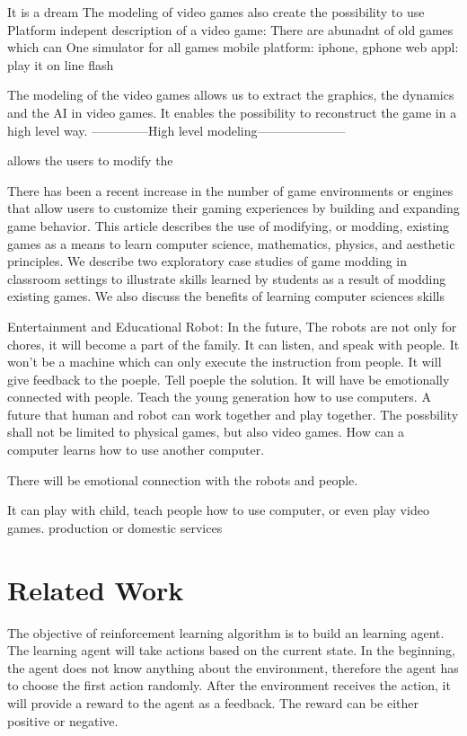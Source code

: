 It is a dream
The modeling of video games also create the possibility to use 
Platform indepent description of a video game:
There are abunadnt of old games which can 
One simulator for all games
mobile platform: iphone, gphone
web appl: play it on line flash

The modeling of the video games allows us to extract the graphics, the dynamics
and the AI in video games. It enables the possibility to reconstruct the game in 
a high level way. 
--------------High level modeling---------------------


allows the users to modify the 

There has been a recent increase in the number of game environments or engines
that allow users to customize their gaming experiences by building and
expanding game behavior. This article describes the use of modifying, or
modding, existing games as a means to learn computer science, mathematics,
physics, and aesthetic principles. We describe two exploratory case studies of
game modding in classroom settings to illustrate skills learned by students as
a result of modding existing games. We also discuss the benefits of learning
computer sciences skills


Entertainment and Educational Robot:
In the future, 
The robots are not only for chores, it will become a part of the family.
It can listen, and speak with people. 
It won't be a machine which can only execute the instruction from people.
It will give feedback to the poeple. Tell poeple the solution.
It will have be emotionally connected with people.
Teach the young generation how to use computers. 
A future that human and robot can work together and play together.
The possbility shall not be limited to physical games, but also video games.
How can a computer learns how to use another computer.

There will be emotional connection with the robots and people. 

It can play with child,
teach people how to use computer, or even play video games. 
production or domestic services

\chapter{Related Work}
\label{ch:Related}

The objective of reinforcement learning algorithm is to build an learning agent. The learning agent will take
actions based on the current state. In the beginning, the agent does not know anything about 
the environment, therefore the agent has to choose the first action randomly. After the environment
receives the action, it will provide a reward to the agent as a feedback. The reward can be either
positive or negative.

